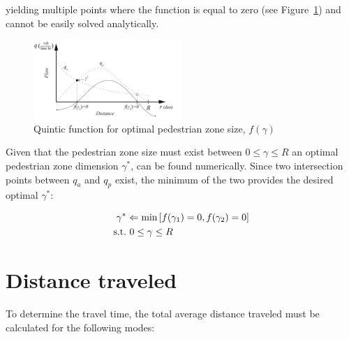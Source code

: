 \documentclass{article}
\begin{document}
\noindent yielding multiple points where the function is equal to zero (see Figure~\ref{fig:optimalped}) and cannot be easily solved analytically.

\begin{figure}[!ht]
     \centering
     \includegraphics[width=0.5\textwidth]{diagram_optimalped}
     \caption{Quintic function for optimal pedestrian zone size, $f(\gamma)$}
     \label{fig:optimalped}
\end{figure}

Given that the pedestrian zone size must exist between $0 \leq \gamma \leq R$ an optimal pedestrian zone dimension $\gamma^*$, can be found numerically. Since two intersection points between $q_a$ and $q_p$ exist, the minimum of the two provides the desired optimal $\gamma^*$:

\begin{align}\small
\gamma^* &\Leftarrow \text{min} \left[ f(\gamma_1) = 0, f(\gamma_2) = 0 \right]\\
\text{s.t.} & ~ 0 \leq \gamma \leq R 
\end{align}

\section{Distance traveled}
To determine the travel time, the total average distance traveled must be calculated for the following modes:
\end{document}
